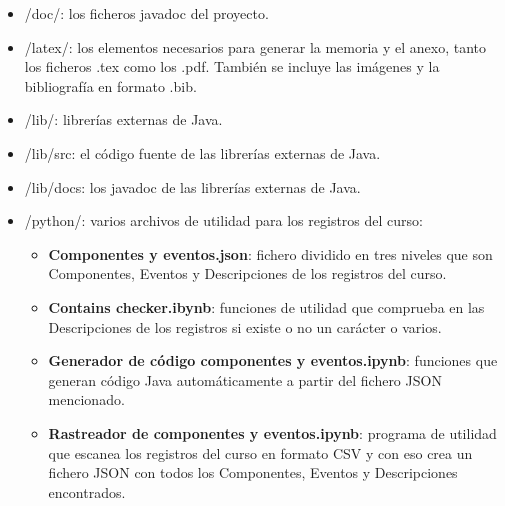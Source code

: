 \begin{itemize}
	\item /doc/: los ficheros javadoc del proyecto.
	\item /latex/: los elementos necesarios para generar la memoria y el anexo, tanto los ficheros .tex como los .pdf. También se incluye las imágenes y la bibliografía en formato .bib.
	\item /lib/: librerías externas de Java.
	\item /lib/src: el código fuente de las librerías externas de Java.
	\item /lib/docs: los javadoc de las librerías externas de Java.
	\item /python/: varios archivos de utilidad para los registros del curso:
	\begin{itemize}
		\item \textbf{Componentes y eventos.json}: fichero dividido en tres niveles que son Componentes, Eventos y Descripciones de los registros del curso.
		\item \textbf{Contains checker.ibynb}: funciones de utilidad que comprueba en las Descripciones de los registros si existe o no un carácter o varios.
		\item \textbf{Generador de código componentes y eventos.ipynb}: funciones que generan código Java automáticamente a partir del fichero JSON mencionado.
		\item \textbf{Rastreador de componentes y eventos.ipynb}: programa de utilidad que escanea los registros del curso en formato CSV y con eso crea un fichero JSON con todos los Componentes, Eventos y Descripciones encontrados.
	\end{itemize}


\end{itemize}
